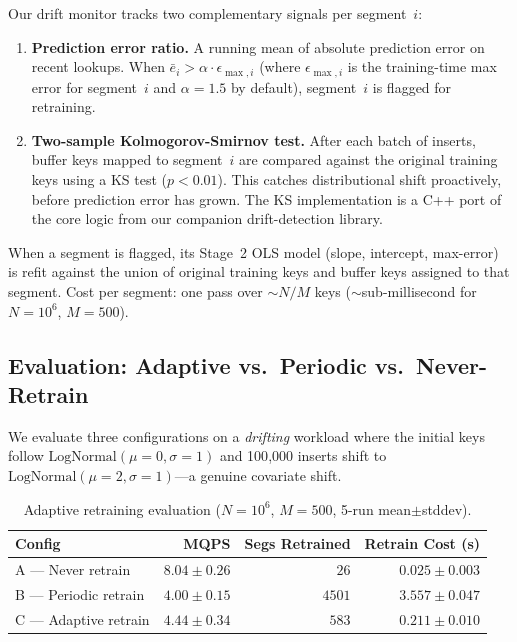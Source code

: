 \documentclass[10pt,twocolumn,a4paper]{article}
\begin{document}
Our drift monitor tracks two complementary signals per segment~$i$:

\begin{enumerate}
    \item \textbf{Prediction error ratio.} A running mean of absolute prediction error on recent lookups. When $\bar{e}_i > \alpha \cdot \epsilon_{\max,i}$ (where $\epsilon_{\max,i}$ is the training-time max error for segment~$i$ and $\alpha = 1.5$ by default), segment~$i$ is flagged for retraining.
    \item \textbf{Two-sample Kolmogorov-Smirnov test.} After each batch of inserts, buffer keys mapped to segment~$i$ are compared against the original training keys using a KS test ($p < 0.01$). This catches distributional shift proactively, before prediction error has grown. The KS implementation is a C++ port of the core logic from our companion drift-detection library.
\end{enumerate}

When a segment is flagged, its Stage~2 OLS model (slope, intercept, max-error) is refit against the union of original training keys and buffer keys assigned to that segment. Cost per segment: one pass over $\sim N/M$ keys ($\sim$sub-millisecond for $N=10^6$, $M=500$).

\subsection{Evaluation: Adaptive vs.\ Periodic vs.\ Never-Retrain}

We evaluate three configurations on a \textit{drifting} workload where the initial keys follow $\text{LogNormal}(\mu{=}0, \sigma{=}1)$ and 100{,}000 inserts shift to $\text{LogNormal}(\mu{=}2, \sigma{=}1)$---a genuine covariate shift.

\begin{table}[t]
\centering
\caption{Adaptive retraining evaluation ($N{=}10^6$, $M{=}500$, 5-run mean$\pm$stddev).}
\label{tab:adaptive}
\begin{tabular}{lrrr}
\toprule
\textbf{Config} & \textbf{MQPS} & \textbf{Segs Retrained} & \textbf{Retrain Cost (s)} \\
\midrule
A --- Never retrain   & $8.04 \pm 0.26$ & $26$   & $0.025 \pm 0.003$ \\
B --- Periodic retrain & $4.00 \pm 0.15$ & $4501$ & $3.557 \pm 0.047$ \\
C --- Adaptive retrain & $4.44 \pm 0.34$ & $583$  & $0.211 \pm 0.010$ \\
\bottomrule
\end{tabular}
\end{table}
\end{document}

